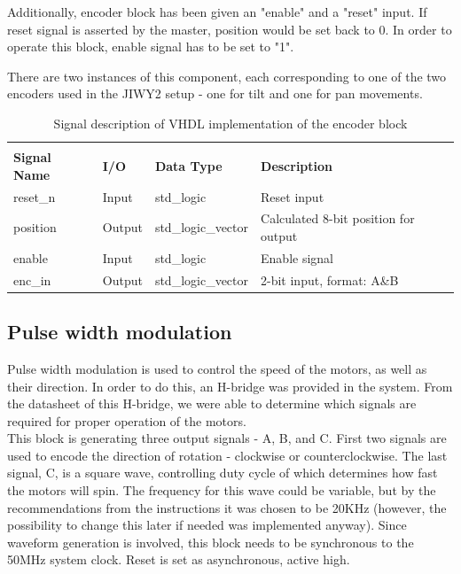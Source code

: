 Additionally, encoder block has been given an "enable" and a "reset" input. If reset signal is asserted by the master, position would be set back to 0. In order to operate this block, enable signal has to be set to "1".

There are two instances of this component, each corresponding to one of the two encoders used in the JIWY2 setup - one for tilt and one for pan movements.

 
\begin{table}[!htbp]
\small
   \caption{Signal description of VHDL implementation of the encoder block}
   \centering
\begin{tabular}{l l l l} \hline\\ 
\textbf{Signal Name} & \textbf{I/O} & \textbf{Data Type} & \textbf{Description}  \\ \hline
reset\_n & Input  & std\_logic & Reset input \\ \hline
position & Output  & std\_logic\_vector & Calculated 8-bit position for output  \\ \hline
enable & Input & std\_logic & Enable signal \\ \hline
enc\_in & Output & std\_logic\_vector & 2-bit input, format: A\&B \\ \hline
\end{tabular}
\vspace{-0.5cm}
\end{table}

\subsection{Pulse width modulation}
Pulse width modulation is used to control the speed of the motors, as well as their direction. In order to do this, an H-bridge was provided in the system. From the datasheet of this H-bridge, we were able to determine which signals are required for proper operation of the motors.\\

This block is generating three output signals - A, B, and C. First two signals are used to encode the direction of rotation - clockwise or counterclockwise. The last signal, C, is a square wave, controlling duty cycle of which determines how fast the motors will spin. The frequency for this wave could be variable, but by the recommendations from the instructions it was chosen to be 20KHz (however, the possibility to change this later if needed was implemented anyway). Since waveform generation is involved, this block needs to be synchronous to the 50MHz system clock. Reset is set as asynchronous, active high.\\

